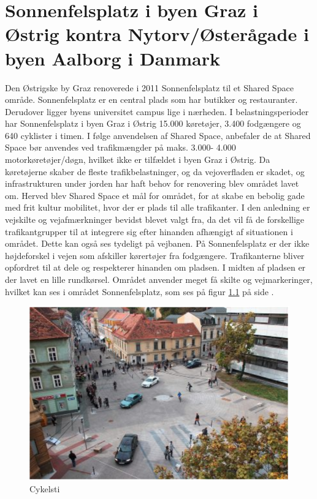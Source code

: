 \chapter{Sonnenfelsplatz i byen Graz i Østrig kontra Nytorv/Østerågade i byen Aalborg i Danmark}
\label{chap:sonnenfelsplatz_i_byen_Graz_i_ostrig kontra_nytorv/osteraagade_i_byen_aalborg_i_danmark}

Den Østrigske by Graz renoverede i 2011 Sonnenfelsplatz til et Shared Space område. Sonnenfelsplatz er en central plads som har butikker og restauranter. Derudover ligger byens universitet campus lige i nærheden. \autocite{ssing2015}
I belastningsperioder har Sonnenfelsplatz i byen Graz i Østrig 15.000 køretøjer, 3.400 fodgængere og 640 cyklister i timen. I følge anvendelsen af Shared Space, anbefaler de at Shared Space bør anvendes ved trafikmængder på maks. 3.000- 4.000 motorkøretøjer/døgn, hvilket ikke er tilfældet i byen Graz i Østrig. \autocite{vejlednigomss2013}
Da køretøjerne skaber de fleste trafikbelastninger, og da vejoverfladen er skadet, og infrastrukturen under jorden har haft behov for renovering blev området lavet om. Herved blev Shared Space et mål for området, for at skabe en bebolig gade med frit kultur mobilitet, hvor der er plads til alle trafikanter. I den anledning er vejskilte og vejafmærkninger bevidst blevet valgt fra, da det vil få de forskellige trafikantgrupper til at integrere sig efter hinanden afhængigt af situationen i området. Dette kan også ses tydeligt på vejbanen.
På Sonnenfelsplatz er der ikke højdeforskel i vejen som afskiller kørertøjer fra fodgængere. Trafikanterne bliver opfordret til at dele og respekterer hinanden om pladsen. I midten af pladsen er der lavet en lille rundkørsel. Området anvender meget få skilte og vejmarkeringer, hvilket kan ses i området Sonnenfelsplatz, som ses på figur \cref{fig:cykelsti} på side \pageref{fig:cykelsti}. \autocite{SP2015}

\begin{figure}[htbp]
  \centering
  \begin{adjustbox}{max width=\textwidth}
    \includegraphics{figures/Billederogfigur/Perspektivering/en_andne_by.png}
 \end{adjustbox}
  \caption{Cykelsti \autocite{sonne}}
   \label{fig:cykelsti}
\end{figure}

